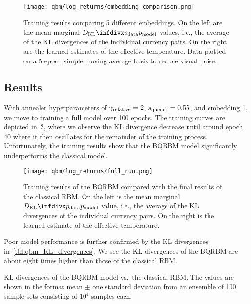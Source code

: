 \begin{figure}[!htb]
    \begin{center}
        \texttt{[image: qbm/log\_returns/embedding\_comparison.png]}
    \end{center}
    \caption{
        Training results comparing 5 different embeddings.
        On the left are the mean marginal \( \DKL{\pdata}{\pmodel} \) values, i.e., the average of the KL divergences of the individual currency pairs.
        On the right are the learned estimates of the effective temperature.
        Data plotted on a 5 epoch simple moving average basis to reduce visual noise.
    }
    \label{fig:qbm_log_returns_embedding_comparison}
\end{figure}

\subsection{Results}\label{sec:qbm_log_returns_results}
With annealer hyperparameters of \( \gamma_{\text{relative}} = 2 \), \( s_{\text{quench}} = 0.55 \), and embedding 1, we move to training a full model over 100 epochs.
The training curves are depicted in~\cref{fig:qbm_log_returns_full_run}, where we observe the KL divergence decrease until around epoch 40 where it then oscillates for the remainder of the training process.
Unfortunately, the training results show that the BQRBM model significantly underperforms the classical model.

\begin{figure}[!htb]
    \begin{center}
        \texttt{[image: qbm/log\_returns/full\_run.png]}
    \end{center}
    \caption{
        Training results of the BQRBM compared with the final results of the classical RBM.
        On the left is the mean marginal \( \DKL{\pdata}{\pmodel} \) value, i.e., the average of the KL divergences of the individual currency pairs.
        On the right is the learned estimate of the effective temperature.
    }
    \label{fig:qbm_log_returns_full_run}
\end{figure}

Poor model performance is further confirmed by the KL divergences in~\cref{tbl:qbm_KL_divergences}.
We see the KL divergences of the BQRBM are about eight times higher than those of the classical RBM.
\begin{table}[!htb]
    \centering
    \begin{adjustbox}{max width=\textwidth}
        
    \end{adjustbox}
    \caption{
        KL divergences of the BQRBM model vs.~the classical RBM.
        The values are shown in the format mean \(\pm\) one standard deviation from an ensemble of 100 sample sets consisting of \( 10^4 \) samples each.
}
    \label{tbl:qbm_KL_divergences}
\end{table}

